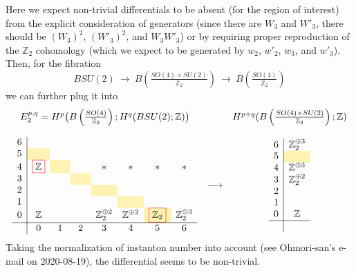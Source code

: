 \documentclass[12pt]{article}
\numberwithin{equation}{section}
\newcommand*{\red}[1]{\textcolor{red}{#1}}
\newcommand*{\black}[1]{\textcolor{black}{#1}}
\def\bZ{\mathbb{Z}}
\begin{document}
Here we expect non-trivial differentials to be absent (for the region of interest)
from the explicit consideration of generators (since there are $W_3$ and $W'_3$, there should be $(W_3)^2$, $(W'_3)^2$, and $W_3W'_3$)
or by requiring proper reproduction of the $\bZ_2$ cohomology (which we expect to be generated by $w_2$, $w'_2$, $w_3$, and $w'_3$).
Then, for the fibration
\begin{equation}
	BSU(2)
	\ \to\ 
	B\left(\tfrac{SO(4)\times SU(2)}{\bZ_2}\right)
	\ \to\ 
	B\left(\tfrac{SO(4)}{\bZ_2}\right)
\end{equation}
we can further plug it into
\begin{equation}
	\begin{array}{ccc}
		E_2^{p,q}=H^p\big(B\left(\tfrac{SO(4)}{\bZ_2}\right);H^q(BSU(2);\bZ)\big) && H^{p+q}(B\left(\tfrac{SO(4)\times SU(2)}{\bZ_2}\right);\bZ)\vspace{4mm}\\
		\begin{array}{c|ccccccccccccc}
			6  &&&&&& \\
			5  & \cellcolor{lightyellow} & \hphantom{\bZ_2} & \hphantom{\bZ_2} & \hphantom{\bZ_2} & \hphantom{\bZ_2} & \hphantom{\bZ_2} \\
			4  & \red{\fbox{\black{$\bZ$}}} & \cellcolor{lightyellow} && \ast & \ast & \ast & \ast\\
			3  &  && \cellcolor{lightyellow} &&&\\
			2  &&  && \cellcolor{lightyellow} &&\\
			1  &  &&  && \cellcolor{lightyellow} &&\\
			0 & \bZ &  && \bZ_2^{\oplus 2} & \bZ^{\oplus 2} & \red{\fbox{\black{$\bZ_2$}}}\cellcolor{lightyellow} & \bZ_2^{\oplus 3}\\
			\hline
			& 0 & 1 & 2 & 3 & 4 & 5 & 6 \\
		\end{array}
		& \longrightarrow & 
		\begin{array}{c|c}
			6  & \bZ_2^{\oplus 3}\\
			5  & \cellcolor{lightyellow}\\
			4  & \bZ^{\oplus 3}\\
			3  & \bZ_2^{\oplus 2}\\
			2  & \\
			1  & \\
			0 & \bZ\\
			\hline\\
		\end{array}
	\end{array}
\end{equation}
Taking the normalization of instanton number into account (see Ohmori-san's e-mail on 2020-08-19),
the differential \red{\fbox{\black{$d_2 : E_{0,4} \to E_{5,0}$}}} seems to be non-trivial.
\end{document}
